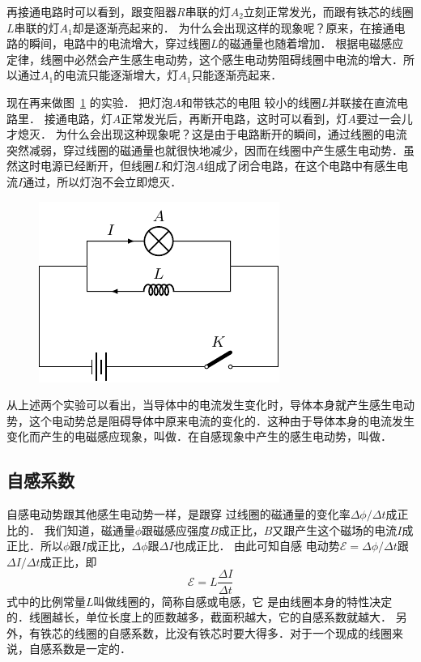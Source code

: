再接通电路时可以看到，跟变阻器$R$串联的灯$A_2$立刻正常发光，而跟有铁芯的线圈$L$串联的灯$A_1$却是逐渐亮起来的．
为什么会出现这样的现象呢？原来，在接通电路的瞬间，电路中的电流增大，穿过线圈$L$的磁通量也随着增加．
根据电磁感应定律，线圈中必然会产生感生电动势，这个感生电动势阻碍线圈中电流的增大．所以通过$A_1$的电流只能逐渐增大，灯$A_1$只能逐渐亮起来．


现在再来做图~\ref{fig_C_2-26} 的实验．
把灯泡$A$和带铁芯的电阻
较小的线圈$L$并联接在直流电路里．
接通电路，灯$A$正常发光后，再断开电路，这时可以看到，灯$A$要过一会儿才熄灭．
为什么会出现这种现象呢？这是由于电路断开的瞬间，通过线圈的电流突然减弱，穿过线圈的磁通量也就很快地减少，因而在线圈中产生感生电动势．虽然这时电源已经断开，但线圈$L$和灯泡$A$组成了闭合电路，在这个电路中有感生电流$I$通过，所以灯泡不会立即熄灭．
\begin{figure}[htbp]
	\centering
	\includegraphics{fig/C/2-26.pdf}
	\caption{}\label{fig_C_2-26}
\end{figure}


从上述两个实验可以看出，当导体中的电流发生变化时，导体本身就产生感生电动势，这个电动势总是阻碍导体中原来电流的变化的．这种由于导体本身的电流发生变化而产生的电磁感应现象，叫做．在自感现象中产生的感生电动势，叫做．

\subsection{自感系数}
自感电动势跟其他感生电动势一样，是跟穿
过线圈的磁通量的变化率$\Delta\phi/\Delta t$成正比的．
我们知道，磁通量$\phi$跟磁感应强度$B$成正比，$B$又跟产生这个磁场的电流$I$成正比．所以$\phi$跟$I$成正比，$\Delta \phi$跟$\Delta I$也成正比．
由此可知自感
电动势$\mathcal{E}=\Delta\phi/\Delta t$跟$\Delta I/\Delta t$成正比，即
\[\mathcal{E}=L\frac{\Delta I}{\Delta t}\]
式中的比例常量$L$叫做线圈的，简称自感或电感，它
是由线圈本身的特性决定的．线圈越长，单位长度上的匝数越多，截面积越大，它的自感系数就越大．
另外，有铁芯的线圈的自感系数，比没有铁芯时要大得多．对于一个现成的线圈来说，自感系数是一定的．

